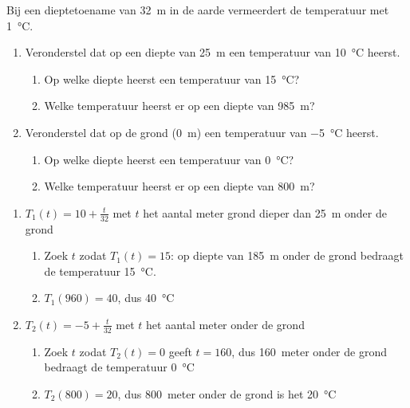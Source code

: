 \begin{oef}
 Bij een dieptetoename van \SI{32}{\meter} in de aarde vermeerdert
    de temperatuur met \SI{1}{\celsius}.
    \begin{enumerate}
    \item Veronderstel dat op een diepte van \SI{25}{\meter} een temperatuur
    van \SI{10}{\celsius} heerst.
        \begin{enumerate}
        \item Op welke diepte heerst een temperatuur van
        \SI{15}{\celsius}?
        \item Welke temperatuur heerst er op een diepte van \SI{985}{\meter}?
        \end{enumerate}
    \item Veronderstel dat op de grond (\SI{0}{\meter}) een temperatuur
    van \SI{-5}{\celsius} heerst.
        \begin{enumerate}
        \item Op welke diepte heerst een temperatuur van
        \SI{0}{\celsius}?
        \item Welke temperatuur heerst er op een diepte van \SI{800}{\meter}?
        \end{enumerate}
    \end{enumerate}
\begin{opl}
\begin{enumerate}
\item 
$T_1(t)=10+\frac{t}{32}$ met $t$ het aantal meter grond dieper dan \SI{25}{\meter} onder de grond
\begin{enumerate}
\item Zoek $t$ zodat $T_1(t)=15$: op diepte van \SI{185}{\meter} onder de grond bedraagt de temperatuur \SI{15}{\celsius}.
\item $T_1(960)=40$, dus \SI{40}{\celsius}
\end{enumerate}
\item $T_2(t)=-5+\frac{t}{32}$ met $t$ het aantal meter onder de grond
\begin{enumerate}
\item Zoek $t$ zodat $T_2(t)=0$ geeft $t=160$, dus \SI{160}{meter} onder de grond bedraagt de temperatuur \SI{0}{\celsius}
\item $T_2(800)=20$, dus \SI{800}{meter} onder de grond is het \SI{20}{\celsius}
\end{enumerate}
\end{enumerate}
\end{opl}
\end{oef}





